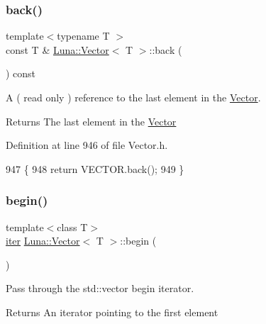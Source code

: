 \subsubsection{\texorpdfstring{back()}{back()}\hspace{0.1cm}{\footnotesize\ttfamily [2/2]}}
{\footnotesize\ttfamily template$<$typename T $>$ \\
const T \& \hyperlink{classLuna_1_1Vector}{Luna\+::\+Vector}$<$ T $>$\+::back (\begin{DoxyParamCaption}{ }\end{DoxyParamCaption}) const\hspace{0.3cm}{\ttfamily [inline]}}



A ( read only ) reference to the last element in the \hyperlink{classLuna_1_1Vector}{Vector}. 

\begin{DoxyReturn}{Returns}
The last element in the \hyperlink{classLuna_1_1Vector}{Vector} 
\end{DoxyReturn}


Definition at line 946 of file Vector.\+h.


\begin{DoxyCode}
947   \{
948     \textcolor{keywordflow}{return} VECTOR.back();
949   \}
\end{DoxyCode}
\mbox{\label{classLuna_1_1Vector_a88e47962286f0dd912fb19849731e67a}} 
\subsubsection{\texorpdfstring{begin()}{begin()}\hspace{0.1cm}{\footnotesize\ttfamily [1/2]}}
{\footnotesize\ttfamily template$<$class T$>$ \\
\hyperlink{classLuna_1_1Vector_aa6c4164f0cd114da31acfde53a36d65e}{iter} \hyperlink{classLuna_1_1Vector}{Luna\+::\+Vector}$<$ T $>$\+::begin (\begin{DoxyParamCaption}{ }\end{DoxyParamCaption})\hspace{0.3cm}{\ttfamily [inline]}}



Pass through the std\+::vector begin iterator. 

\begin{DoxyReturn}{Returns}
An iterator pointing to the first element 
\end{DoxyReturn}



